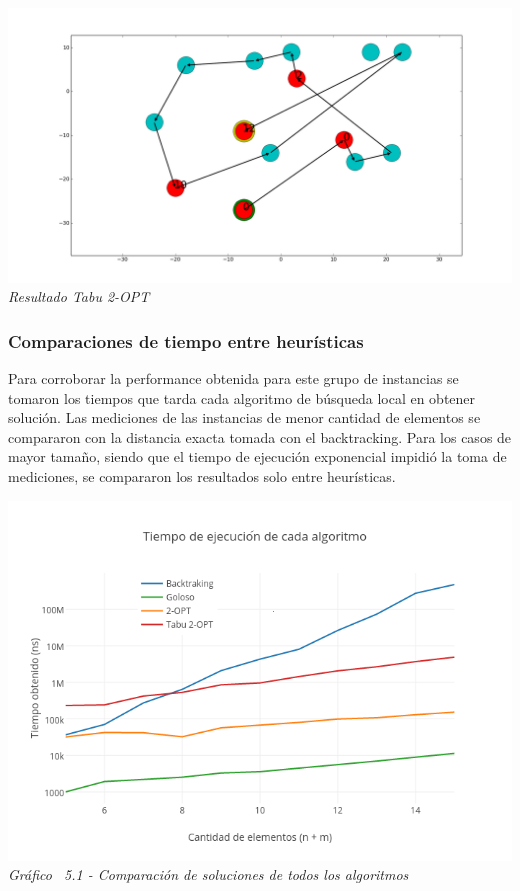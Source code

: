     \vspace*{0.3cm} \vspace*{0.3cm}
  \begin{center}
\includegraphics[scale=0.3]{./EJ5/caminoTabu.png}
\\{\textit{Resultado Tabu 2-OPT}}
  \end{center}
  \vspace*{0.3cm}


\subsubsection{Comparaciones de tiempo entre heurísticas}

Para corroborar la performance obtenida para este grupo de instancias se tomaron los tiempos que tarda cada algoritmo de búsqueda local en obtener soluci\'on. 
 Las mediciones de las instancias de menor cantidad de elementos se compararon con la distancia exacta tomada con el backtracking. Para los casos de mayor tamaño, siendo que el tiempo de ejecución exponencial impidió la toma de mediciones, se compararon los resultados solo entre heurísticas.


\vspace*{0.3cm} \vspace*{0.3cm}
  \begin{center}
 \includegraphics[scale=0.5]{./EJ5/medicionTodos.png}\\
 {\textit{Gráfico \ 5.1 - Comparaci\'on de soluciones de todos los algoritmos}}
  \end{center}
  \vspace*{0.3cm}

